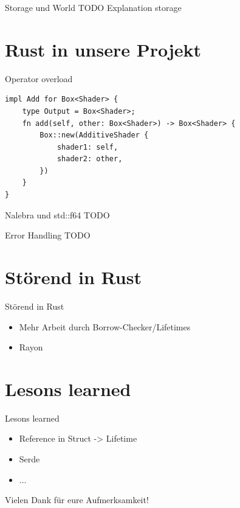 \documentclass{beamer}
\begin{document}
\begin{frame}{Storage und World}
    TODO Explanation storage
\end{frame}

\section{Rust in unsere Projekt}
\begin{frame}[fragile]{Operator overload}
    \begin{lstlisting}
impl Add for Box<Shader> {
    type Output = Box<Shader>;
    fn add(self, other: Box<Shader>) -> Box<Shader> {
        Box::new(AdditiveShader {
            shader1: self,
            shader2: other,
        })
    }
}
    \end{lstlisting}
\end{frame}

\begin{frame}{Nalebra und std::f64}
    TODO
\end{frame}

\begin{frame}{Error Handling}
    TODO
\end{frame}

\section{Störend in Rust}
\begin{frame}{Störend in Rust}
    \begin{itemize}[<+->]
        \item Mehr Arbeit durch Borrow-Checker/Lifetimes
        \item Rayon 
    \end{itemize}
\end{frame}

\section{Lesons learned}
\begin{frame}{Lesons learned}
    \begin{itemize}[<+->]
        \item Reference in Struct -> Lifetime
        \item Serde
        \item ...
    \end{itemize}
\end{frame}

\begin{frame}[standout]
\centering
\Huge Vielen Dank für eure Aufmerksamkeit!

\end{frame}
\end{document}
